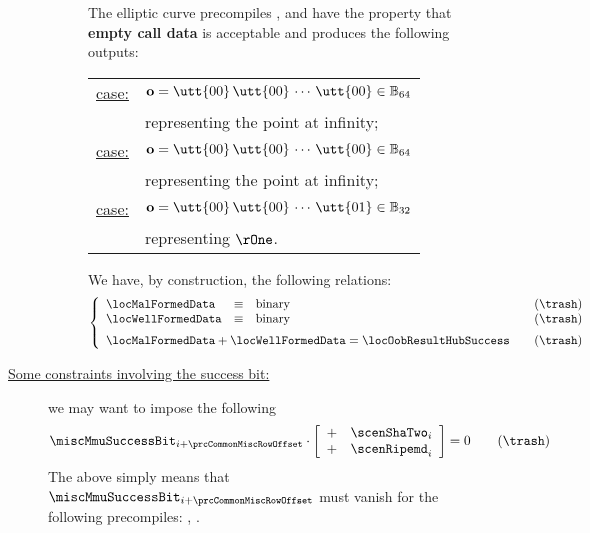 \begin{description}
\begin{description}
\begin{description}
						\saNote{}
						The elliptic curve precompiles
						\instEcadd{}, \instEcmul{} and \instEcpairing{}
						have the property that \textbf{empty call data} is acceptable and produces the following outputs:
						\begin{center}
							\begin{tabular}{|ll|}
								\hline
								\underline{\instEcadd{} case:}     & $\textbf{o} = \utt{00}\, \utt{00}\, \cdots \, \utt{00} \in \mathbb{B}_{64}$ \\
                                                                                                   & representing the point at infinity;                                         \\
								\underline{\instEcmul{} case:}     & $\textbf{o} = \utt{00}\, \utt{00}\, \cdots \, \utt{00} \in \mathbb{B}_{64}$ \\
                                                                                                   & representing the point at infinity;                                         \\
								\underline{\instEcpairing{} case:} & $\textbf{o} = \utt{00}\, \utt{00}\, \cdots \, \utt{01} \in \mathbb{B}_{32}$ \\
                                                                                                   & representing $\rOne$.                                                       \\ \hline
							\end{tabular}
						\end{center}
						\saNote{} We have, by construction, the following relations:
						\[
							\left\{ \begin{array}{lclr}
								\locMalFormedData    & \equiv & \text{binary} & \quad (\trash) \\
								\locWellFormedData   & \equiv & \text{binary} & \quad (\trash) \vspace{2mm} \\
								\multicolumn{3}{l}{\locMalFormedData + \locWellFormedData = \locOobResultHubSuccess} & \quad (\trash) \\
							\end{array} \right.
						\]
				\end{description}
			\item[\underline{Some constraints involving the success bit:}]
				we may want to impose the following
				\[
					\miscMmuSuccessBit_{i + \prcCommonMiscRowOffset} \cdot 
					\left[ \begin{array}{cl}
						+ & \scenShaTwo        _{i}  \\
						+ & \scenRipemd        _{i}  \\
					\end{array} \right]
					= 0 \qquad (\trash)
				\]
				The above simply means that $\miscMmuSuccessBit_{i + \prcCommonMiscRowOffset}$ must vanish for the following precompiles:
				\instShaTwo{},
				\instRipemd{}.


\end{description}
\end{description}
